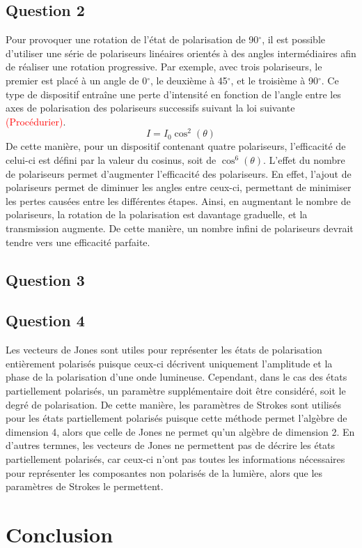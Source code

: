 \documentclass[11pt,letterpaper]{article}
\begin{document}
\subsection{Question 2}
Pour provoquer une rotation de l'état de polarisation de 90$^\circ$, il est possible d'utiliser une série de polariseurs linéaires orientés à des angles intermédiaires afin de réaliser une rotation progressive. Par exemple, avec trois polariseurs, le premier est placé à un angle de 0$^\circ$, le deuxième à 45$^\circ$, et le troisième à 90$^\circ$. Ce type de dispositif entraîne une perte d'intensité en fonction de l'angle entre les axes de polarisation des polariseurs successifs suivant la loi suivante \textcolor{red}{(Procédurier)}.
\begin{equation}
  I=I_{0}\cos^{2}(\theta)
\end{equation}
De cette manière, pour un dispositif contenant quatre polariseurs, l'efficacité de celui-ci est défini par la valeur du cosinus, soit de $\cos^{6}(\theta)$. L'effet du nombre de polariseurs permet d'augmenter l'efficacité des polariseurs. En effet, l'ajout de polariseurs permet de diminuer les angles entre ceux-ci, permettant de minimiser les pertes causées entre les différentes étapes. Ainsi, en augmentant le nombre de polariseurs, la rotation de la polarisation est davantage graduelle, et la transmission augmente. De cette manière, un nombre infini de polariseurs devrait tendre vers une efficacité parfaite.

\subsection{Question 3}

\subsection{Question 4}
Les vecteurs de Jones sont utiles pour représenter les états de polarisation entièrement polarisés puisque ceux-ci décrivent uniquement l'amplitude et la phase de la polarisation d'une onde lumineuse. Cependant, dans le cas des états partiellement polarisés, un paramètre supplémentaire doit être considéré, soit le degré de polarisation. De cette manière, les paramètres de Strokes sont utilisés pour les états partiellement polarisés puisque cette méthode permet l'algèbre de dimension 4, alors que celle de Jones ne permet qu'un algèbre de dimension 2. En d'autres termnes, les vecteurs de Jones ne permettent pas de décrire les états partiellement polarisés, car ceux-ci n'ont pas toutes les informations nécessaires pour représenter les composantes non polarisés de la lumière, alors que les paramètres de Strokes le permettent.

\section{Conclusion}



\clearpage

% 
% 
\end{document}
